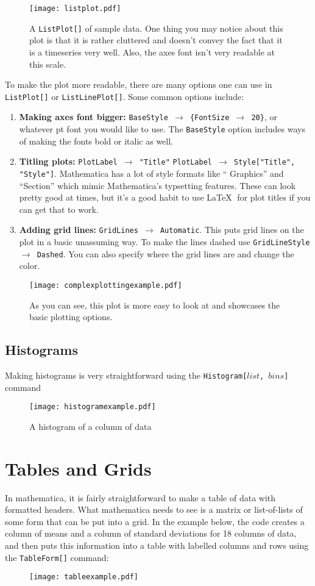 \begin{figure}[h]
\centering\texttt{[image: listplot.pdf]}
\caption{A \texttt{ListPlot[]} of sample data. One thing you may notice about this  plot is that it is rather cluttered and doesn't convey the fact that it is a timeseries very well. Also, the axes font isn't very readable at this scale.}
\end{figure}
To make the plot more readable, there are many options one can use in \texttt{ListPlot[]} or \texttt{ListLinePlot[]}. Some common options include:
\begin{enumerate}
\item {\bf Making axes font bigger:} \texttt{BaseStyle $\to$ \{FontSize $\to$ 20\}}, or whatever pt font you would like to use. The \texttt{BaseStyle} option includes ways of making the fonts bold or italic as well.
\item {\bf Titling plots:} \texttt{PlotLabel $\to$ "Title"} \texttt{PlotLabel $\to$ Style["Title", "Style"]}. Mathematica has a lot of style formats like `` Graphics'' and ``Section'' which mimic Mathematica's typsetting features. These can look pretty good at times, but it's a good habit to use \LaTeX $\;$ for plot titles if you can get that to work.
\item {\bf Adding grid lines:} \texttt{GridLines $\to$ Automatic}. This puts grid lines on the plot in a basic unassuming way. To make the lines dashed use \texttt{GridLineStyle $\to$ Dashed}. You can also specify where the grid lines are and change the color.

\end{enumerate}

\begin{figure}[h]
\centering\texttt{[image: complexplottingexample.pdf]}
\caption{As you can see, this plot is more easy to look at and showcases the basic plotting options.}
\label{fig:listlineplot}
\end{figure}
\subsection{Histograms}
Making histograms is very straightforward using the \texttt{Histogram[$list$, $bins$]} command
\begin{figure}[H]
\centering \texttt{[image: histogramexample.pdf]}
\caption{A histogram of a column of data}
\label{fig:histexample}
\end{figure}


\newpage
\section{Tables and Grids}
In mathematica, it is fairly straightforward to make a table of data with formatted headers. What mathematica needs to see is a matrix or list-of-lists of some form that can be put into a grid. In the example below, the code creates a column of means and a column of standard deviations for 18 columns of data, and then puts this information into a table with labelled columns and rows using the \texttt{TableForm[]} command:
\begin{figure}[H]
\centering \texttt{[image: tableexample.pdf]}
\end{figure}
\newpage
